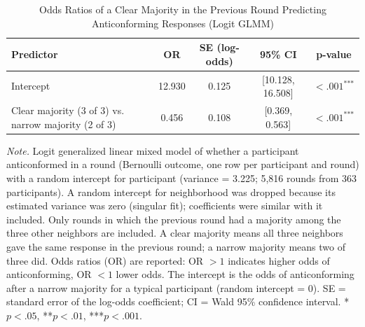 \begin{table}[H]
\centering
\caption{Odds Ratios of a Clear Majority in the Previous Round Predicting Anticonforming Responses (Logit GLMM)}
\label{tab:or_antic_clearmaj}
\begingroup
\footnotesize
\renewcommand{\arraystretch}{0.90}

\begin{tabularx}{\linewidth}{Xcccc}
\toprule
\textbf{Predictor} & \textbf{OR} & \textbf{SE (log-odds)} & \textbf{95\% CI} & \textbf{p-value} \\
\midrule
Intercept & 12.930 & 0.125 & [10.128, 16.508] & $< .001^{\text{***}}$ \\
Clear majority (3 of 3) vs. narrow majority (2 of 3) & 0.456 & 0.108 & [0.369, 0.563] & $< .001^{\text{***}}$ \\
\bottomrule
\end{tabularx}

\vspace{0.6em}
{\footnotesize
\setlength{\baselineskip}{12pt}
\textit{Note.} Logit generalized linear mixed model of whether a participant anticonformed in a round (Bernoulli outcome, one row per participant and round) with a random intercept for participant (variance = 3.225; 5,816 rounds from 363 participants). A random intercept for neighborhood was dropped because its estimated variance was zero (singular fit); coefficients were similar with it included. Only rounds in which the previous round had a majority among the three other neighbors are included. A clear majority means all three neighbors gave the same response in the previous round; a narrow majority means two of three did. Odds ratios (OR) are reported: OR $> 1$ indicates higher odds of anticonforming, OR $< 1$ lower odds. The intercept is the odds of anticonforming after a narrow majority for a typical participant (random intercept = 0). SE = standard error of the log-odds coefficient; CI = Wald 95\% confidence interval. *$p < .05$, **$p < .01$, ***$p < .001$.
\par}
\endgroup
\end{table}
